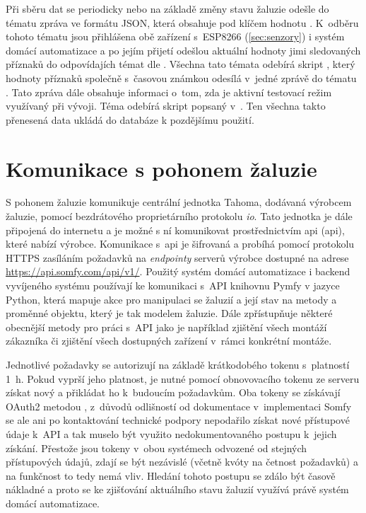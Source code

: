     Při sběru dat se periodicky nebo na základě změny stavu žaluzie odešle do tématu  zpráva ve formátu JSON, která obsahuje pod klíčem  hodnotu . K~odběru tohoto tématu jsou přihlášena obě zařízení s~ESP8266 (\cref{sec:senzory}) i systém domácí automatizace a po jejím přijetí odešlou aktuální hodnoty jimi sledovaných příznaků do odpovídajích témat dle . Všechna tato témata odebírá skript , který hodnoty příznaků společně s~časovou známkou odesílá v~jedné zprávě do tématu . Tato zpráva dále obsahuje informaci o~tom, zda je aktivní testovací režim využívaný při vývoji. Téma  odebírá skript  popsaný v~. Ten všechna takto přenesená data ukládá do databáze k pozdějšímu použití.
  
  \section{Komunikace s pohonem žaluzie}
    S pohonem žaluzie komunikuje centrální jednotka Tahoma, dodávaná výrobcem žaluzie, pomocí bezdrátového proprietárního protokolu \emph{io}. Tato jednotka je dále připojená do internetu a je možné s ní komunikovat prostřednictvím \acrlong{api} (\acrshort{api}), které nabízí výrobce. Komunikace s~\acrshort{api} je šifrovaná a probíhá pomocí protokolu HTTPS zasíláním požadavků na \emph{endpointy} serverů výrobce dostupné na adrese \href{https://api.somfy.com/api/v1/}{https://api.somfy.com/api/v1/}. Použitý systém domácí automatizace i backend vyvíjeného systému používají ke komunikaci s~API knihovnu Pymfy v jazyce Python, která mapuje akce pro manipulaci se žaluzií a její stav na metody a proměnné objektu, který je tak modelem žaluzie. Dále zpřístupňuje některé obecnější metody pro práci s~API jako je například zjištění všech montáží zákazníka či zjištění všech dostupných zařízení v~rámci konkrétní montáže.

    Jednotlivé požadavky se autorizují na základě krátkodobého tokenu s~platností 1~h. Pokud vyprší jeho platnost, je nutné pomocí obnovovacího tokenu ze serveru získat nový a přikládat ho k~budoucím požadavkům. Oba tokeny se získávají OAuth2 metodou , z~důvodů odlišností od dokumentace v~implementaci Somfy se ale ani po kontaktování technické podpory nepodařilo získat nové přístupové údaje k~API a tak muselo být využito nedokumentovaného postupu k~jejich získání. Přestože jsou tokeny v~obou systémech odvozené od stejných přístupových údajů, zdají se být nezávislé (včetně kvóty na četnost požadavků) a na funkčnost to tedy nemá vliv. Hledání tohoto postupu se zdálo být časově nákladné a proto se ke zjišťování aktuálního stavu žaluzií využívá právě systém domácí automatizace.

